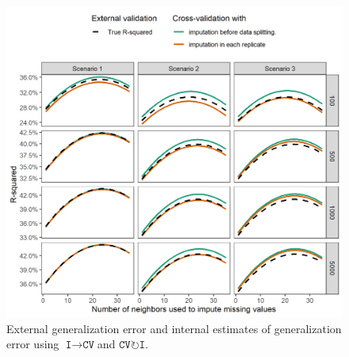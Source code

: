 \documentclass[AMA,STIX1COL,doublespace]{WileyNJD-v2}
\begin{document}
\begin{figure}
\includegraphics[width=1\linewidth]{figs/sim_r2} 
\caption{External generalization error and internal estimates of generalization error using $\texttt{I}\!\!\rightarrow\!\texttt{CV}$\space and $\texttt{CV}\!\circlearrowright\!\texttt{I}$.}
\label{fig:sim_r2}
\end{figure}

\FloatBarrier


\end{document}

